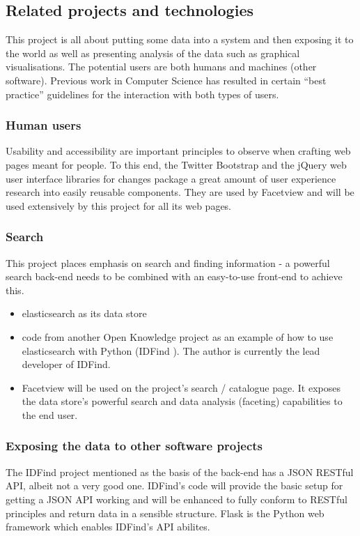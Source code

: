 \documentclass[11pt,fleqn,twoside]{article}
\begin{document}
\subsection{Related projects and technologies}
\label{related-projects}
This project is all about putting some data into a system and then exposing it to the world as well as presenting analysis of the data such as graphical visualisations. The potential users are both humans and machines (other software). Previous work in Computer Science has resulted in certain ``best practice'' guidelines for the interaction with both types of users.

\subsubsection{Human users}
Usability and accessibility are important principles to observe when crafting web pages meant for people. To this end, the Twitter Bootstrap \cite{bootstrap} and the jQuery \cite{jquery} web user interface libraries for changes package a great amount of user experience research into easily reusable components. They are used by Facetview and will be used extensively by this project for all its web pages.

\subsubsection{Search}
\label{idfind-based}
This project places emphasis on search and finding information - a powerful search back-end needs to be combined with an easy-to-use front-end to achieve this.

\begin{itemize}
	\item elasticsearch \cite{es} as its data store
	\item code from another Open Knowledge project as an example of how to use elasticsearch with Python (IDFind \cite{idfind}). The author is currently the lead developer of IDFind.
	\item Facetview \cite{facetview} will be used on the project's search / catalogue page. It exposes the data store's powerful search and data analysis (faceting) capabilities to the end user.
\end{itemize}

\subsubsection{Exposing the data to other software projects}
The IDFind project mentioned as the basis of the back-end has a JSON RESTful API, albeit not a very good one. IDFind's code will provide the basic setup for getting a JSON API working and will be enhanced to fully conform to RESTful principles and return data in a sensible structure. Flask \cite{flask} is the Python web framework which enables IDFind's API abilites.
\end{document}
